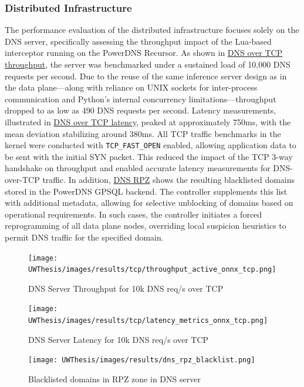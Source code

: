 \documentclass [11pt, proquest] {uwthesis}[2020/02/24]
\begin{document}
\subsubsection{Distributed Infrastructure}
The performance evaluation of the distributed infrastructure focuses solely on the DNS server, specifically assessing the throughput impact of the Lua-based interceptor running on the PowerDNS Recursor. As shown in \hyperref[fig:throughput_gsld_tcp]{DNS over TCP throughput}, the server was benchmarked under a sustained load of 10,000 DNS requests per second. Due to the reuse of the same inference server design as in the data plane—along with reliance on UNIX sockets for inter-process communication and Python’s internal concurrency limitations—throughput dropped to as low as 490 DNS requests per second. Latency measurements, illustrated in \hyperref[fig:throughput_onnx_tcp]{DNS over TCP latency}, peaked at approximately 750ms, with the mean deviation stabilizing around 380ms.
All TCP traffic benchmarks in the kernel were conducted with \texttt{TCP\_FAST\_OPEN} enabled, allowing application data to be sent with the initial SYN packet. This reduced the impact of the TCP 3-way handshake on throughput and enabled accurate latency measurements for DNS-over-TCP traffic.
In addition, \hyperref[fig:dns_rpz]{DNS RPZ} shows the resulting blacklisted domains stored in the PowerDNS GPSQL backend. The controller supplements this list with additional metadata, allowing for selective unblocking of domains based on operational requirements. In such cases, the controller initiates a forced reprogramming of all data plane nodes, overriding local suspicion heuristics to permit DNS traffic for the specified domain.



\begin{figure}[H]
  \centering
  \texttt{[image: UWThesis/images/results/tcp/throughput\_active\_onnx\_tcp.png]}
  \caption{DNS Server Throughput for 10k DNS req/s over TCP}
  \label{fig:throughput_gsld_tcp}
\end{figure}

\begin{figure}[H]
  \centering
  \texttt{[image: UWThesis/images/results/tcp/latency\_metrics\_onnx\_tcp.png]}
  \caption{DNS Server Latency for 10k DNS req/s over TCP}
  \label{fig:throughput_onnx_tcp}
\end{figure}



\begin{figure}[H]
  \texttt{[image: UWThesis/images/results/dns\_rpz\_blacklist.png]}
\caption{Blacklisted domains in RPZ zone in DNS server}
  \label{fig:dns_rpz}
\end{figure}
\end{document}

